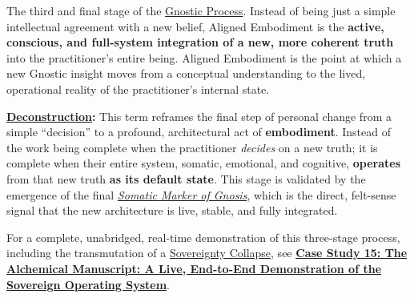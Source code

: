 \item[\hypertarget{gloss:aligned_embodiment}{Aligned Embodiment}]
    The third and final stage of the \hyperlink{gloss:gnostic_process}{Gnostic Process}. Instead of being just a simple intellectual agreement with a new belief, Aligned Embodiment is the \textbf{active, conscious, and full-system integration of a new, more coherent truth} into the practitioner's entire being. Aligned Embodiment is the point at which a new Gnostic insight moves from a conceptual understanding to the lived, operational reality of the practitioner's internal state.
    \begin{nobullet}
        \item \textbf{\hyperlink{gloss:deconstruction}{Deconstruction}:} This term reframes the final step of personal change from a simple ``decision'' to a profound, architectural act of \textbf{embodiment}. Instead of the work being complete when the practitioner \textit{decides} on a new truth; it is complete when their entire system, somatic, emotional, and cognitive, \textbf{operates} from that new truth \textbf{as its default state}. This stage is validated by the emergence of the final \textit{\hyperlink{gloss:somatic_marker_of_gnosis}{Somatic Marker of Gnosis}}, which is the direct, felt-sense signal that the new architecture is live, stable, and fully integrated.

        For a complete, unabridged, real-time demonstration of this three-stage process, including the transmutation of a \hyperlink{gloss:sovereignty_collapse}{\hyperlink{gloss:sovereignty}{\hyperlink{gloss:sovereignty}{Sovereignty}} Collapse}, see \hyperref[case_study_15]{\textbf{Case Study 15: The Alchemical Manuscript: A Live, End-to-End Demonstration of the Sovereign Operating System}}.
    \end{nobullet}

